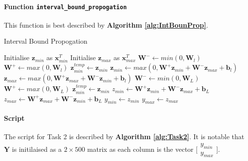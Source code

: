 \documentclass[11pt]{article}
\begin{document}
\paragraph{Function \texttt{interval\_bound\_propogation}} This function is best described by \textbf{Algorithm \ref{alg:IntBounProp}}.
\begin{algorithm}
    \caption{Interval Bound Propogation}\label{alg:IntBounProp}
    \begin{algorithmic}
        \State Initialise $\boldsymbol{z}_{min}$ as $\boldsymbol{x}_{min}^T$
        \State Initialise $\boldsymbol{z}_{max}$ as $\boldsymbol{x}_{max}^T$
         
            \State $\boldsymbol{W}^- \gets min(0,\boldsymbol{W}_l)$ 
            \State $\boldsymbol{W}^+ \gets max(0,\boldsymbol{W}_l)$ 
            \State $\boldsymbol{z}_{min}^{temp} \gets \boldsymbol{z}_{min}$
            \State $\boldsymbol{z}_{min} \gets max(0,\boldsymbol{W}^+\boldsymbol{z}_{min}+\boldsymbol{W}^-\boldsymbol{z}_{max} + \boldsymbol{b}_l)$
            \State $\boldsymbol{z}_{max} \gets max(0,\boldsymbol{W}^+\boldsymbol{z}_{max}+\boldsymbol{W}^-\boldsymbol{z}_{min} + \boldsymbol{b}_l)$
        \EndFor
        \State $\boldsymbol{W}^- \gets min(0,\boldsymbol{W}_L)$
        \State $\boldsymbol{W}^+ \gets max(0,\boldsymbol{W}_L)$
        \State $\boldsymbol{z}_{min}^{temp} \gets \boldsymbol{z}_{min}$
        \State $z_{min} \gets \boldsymbol{W}^+\boldsymbol{z}_{min}+\boldsymbol{W}^-\boldsymbol{z}_{max} + \boldsymbol{b}_L$
        \State $z_{max} \gets \boldsymbol{W}^+\boldsymbol{z}_{max}+\boldsymbol{W}^-\boldsymbol{z}_{min} + \boldsymbol{b}_L$ 
        \State $y_{min} \gets z_{min}$
        \State $y_{max} \gets z_{max}$
    \end{algorithmic}
\end{algorithm}

\paragraph{Script} The script for Task 2 is described by \textbf{Algorithm \ref{alg:Task2}}. 
It is notable that $\boldsymbol{Y}$ is initilaised as a $2\times500$ matrix as each column is the vector 
$\big[\begin{smallmatrix} 
    y_{min} \\ 
    y_{max} 
\end{smallmatrix}\big]$.
\end{document}
